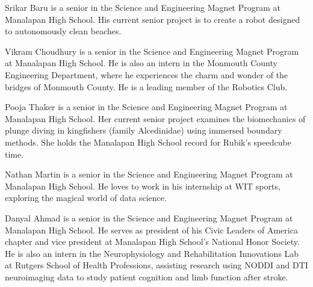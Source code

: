 ﻿\documentclass[10pt,journal,twoside]{IEEEtran}
\begin{document}
\begin{IEEEbiography}{Srikar Baru} is a senior in the Science and Engineering Magnet Program at Manalapan High School. His current senior project is to create a robot designed to autonomously clean beaches. 
\end{IEEEbiography}
\begin{IEEEbiography}{Vikram Choudhury} is a senior in the Science and Engineering Magnet Program at Manalapan High School. He is also an intern in the Monmouth County Engineering Department, where he experiences the charm and wonder of the bridges of Monmouth County. He is a leading member of the Robotics Club.
\end{IEEEbiography}
\vfill
\newpage
\begin{IEEEbiography}{Pooja Thaker} is a senior in the Science and Engineering Magnet Program at Manalapan High School. Her current senior project examines the biomechanics of plunge diving in kingfishers (family Alcedinidae) using immersed boundary methods. She holds the Manalapan High School record for  Rubik's speedcube time. 
\end{IEEEbiography}
\begin{IEEEbiography}{Nathan Martin} is a senior in the Science and Engineering Magnet Program at Manalapan High School. He loves to work in his internship at WIT sports, exploring the magical world of data science. 
\end{IEEEbiography}
\begin{IEEEbiography}{Danyal Ahmad} is a senior in the Science and Engineering Magnet Program at Manalapan High School. He serves as president of his Civic Leaders of America chapter and vice president at Manalapan High School's National Honor Society. He is also an intern in the Neurophysiology and Rehabilitation Innovations Lab at Rutgers School of Health Professions, assisting research using NODDI and DTI neuroimaging data to study patient cognition and limb function after stroke. 
\end{IEEEbiography}
\vfill
\end{document}
